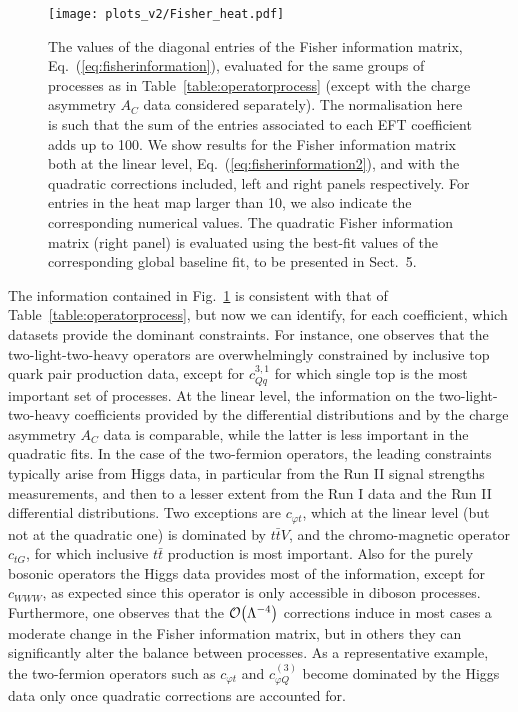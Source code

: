 \begin{figure}[htbp]
  \begin{center}
    \texttt{[image: plots\_v2/Fisher\_heat.pdf]}
    \caption{\small The values of the diagonal entries of the Fisher
      information matrix, Eq.~(\ref{eq:fisherinformation}), evaluated for
      the same groups of processes as in Table~\ref{table:operatorprocess} (except
      with the charge asymmetry $A_C$ data considered separately).
      The normalisation here is such that the sum of the entries associated to each EFT
      coefficient adds up to 100.
      We show results for the Fisher information matrix
      both at the linear level, Eq.~(\ref{eq:fisherinformation2}),
      and with the quadratic corrections included,  left and right panels respectively.
      For entries in the heat map larger than 10, we also indicate the corresponding
      numerical values.
      {  The quadratic Fisher information matrix (right panel)
        is evaluated
        using the best-fit values of the corresponding global baseline
      fit, to be presented in Sect.~5.}
     \label{fig:FisherMatrix} }
  \end{center}
\end{figure}

The information contained in Fig.~\ref{fig:FisherMatrix} is consistent with that of
Table~\ref{table:operatorprocess}, but now we can identify, for each coefficient, which datasets
provide the dominant constraints.
%
For instance, one observes that the two-light-two-heavy operators are overwhelmingly constrained
by inclusive top quark pair production data, except for $c_{Qq}^{3,1}$ for
which single top is the most important set of processes.
%
At the linear level, the information on the two-light-two-heavy coefficients provided
by the differential distributions and by the charge asymmetry $A_C$ data is comparable,
while the latter is less important in the quadratic fits.
%
In the case of the two-fermion operators, the leading constraints typically arise from Higgs data, in particular
from the Run II signal strengths measurements, and then to a lesser extent from the Run I data
and the Run II differential distributions.
%
Two  exceptions are $c_{\varphi t}$, which at the linear level (but not at the quadratic one)
is dominated by $t\bar{t}V$, and the chromo-magnetic operator $c_{tG}$, for which inclusive
$t\bar{t}$ production is most important.
%
Also for the purely bosonic operators the Higgs data provides most of the information,
except for $c_{WWW}$, as expected since this operator is only accessible in
diboson processes.
%
Furthermore, one observes that the $\mathcal{O}\lp \Lambda^{-4}\rp$ corrections induce in most
cases a moderate change in the Fisher information
matrix, but in others they can significantly alter
the balance between processes.
%
As a representative example, the two-fermion operators
such as $c_{\varphi t}$ and $c_{\varphi Q}^{(3)}$
become dominated by the Higgs data only once quadratic corrections are accounted for.

